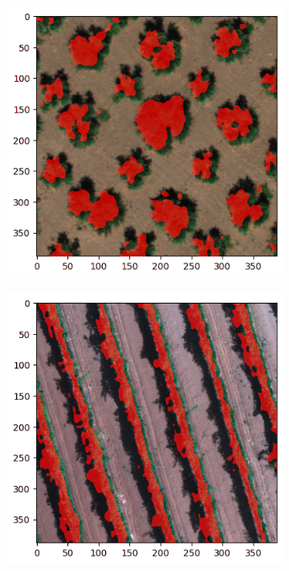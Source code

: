 \documentclass[comsoc,final]{IEEEtran}
\begin{document}
\begin{figure}
{\begin{subfigure}[b]{0.47\columnwidth}
     \end{subfigure}}
%       
      \begin{subfigure}[b]{0.47\columnwidth}
         \centering \includegraphics[width=\columnwidth]{ULIVO1INF}
     \end{subfigure}%
% 
      \begin{subfigure}[b]{0.47\columnwidth}
         \centering \includegraphics[width=\columnwidth]{VITE1INF}

\end{subfigure}
\end{figure}
\end{document}
